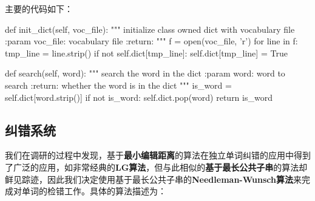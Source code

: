 \documentclass[UTF8,a4paper]{ctexart}
\begin{document}
主要的代码如下：

\begin{python}
    def init_dict(self, voc_file):
        """
        initialize class owned dict with vocabulary file
        :param voc_file: vocabulary file
        :return:
        """
        f = open(voc_file, 'r')
        for line in f:
            tmp_line = line.strip()
            if not self.dict[tmp_line]:
                self.dict[tmp_line] = True

    def search(self, word):
        """
        search the word in the dict
        :param word: word to search
        :return: whether the word is in the dict
        """
        is_word = self.dict[word.strip()]
        if not is_word:
            self.dict.pop(word)
        return is_word
\end{python}

\subsection{纠错系统}

我们在调研的过程中发现，基于\textbf{最小编辑距离}的算法在独立单词纠错的应用中得到了广泛的应用，如非常经典的\textbf{LG算法}，但与此相似的\textbf{基于最长公共子串}的算法却鲜见踪迹，因此我们决定使用基于最长公共子串的\textbf{Needleman-Wunsch算法}来完成对单词的检错工作。具体的算法描述为：
\end{document}
